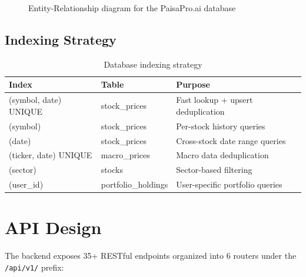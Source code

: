 \documentclass[12pt, a4paper, oneside]{report}
\newcommand{\projectname}{PaisaPro.ai}
\begin{document}
\begin{figure}[H]
\caption{Entity-Relationship diagram for the \projectname{} database}
\label{fig:er_diagram}
\end{figure}

\subsection{Indexing Strategy}

\begin{table}[H]
\centering
\caption{Database indexing strategy}
\label{tab:indexes}
\begin{tabularx}{\textwidth}{@{}l l X@{}}
\toprule
\textbf{Index} & \textbf{Table} & \textbf{Purpose} \\
\midrule
(symbol, date) UNIQUE & stock\_prices & Fast lookup + upsert deduplication \\
(symbol) & stock\_prices & Per-stock history queries \\
(date) & stock\_prices & Cross-stock date range queries \\
(ticker, date) UNIQUE & macro\_prices & Macro data deduplication \\
(sector) & stocks & Sector-based filtering \\
(user\_id) & portfolio\_holdings & User-specific portfolio queries \\
\bottomrule
\end{tabularx}
\end{table}

\section{API Design}
\label{sec:api_design}

The backend exposes 35+ RESTful endpoints organized into 6 routers under the \texttt{/api/v1/} prefix:
\end{document}
